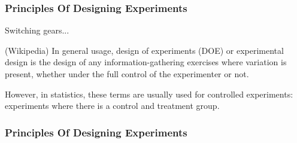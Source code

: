 \documentclass[handout]{beamer}
\newcommand{\blue}[1]{\textcolor{blue2}{#1}}
\begin{document}
\begin{frame}
\frametitle{Principles Of Designing Experiments}

Switching gears...

\vspace{0.5cm}

(Wikipedia) In general usage, \blue{design of experiments (DOE) or experimental design} is the design of any information-gathering exercises where variation is present, whether under the full control of the experimenter or not. 

\vspace{0.5cm}

\pause However, in statistics, these terms are usually used for \blue{controlled experiments}: experiments where there is a control and treatment group.

\end{frame}


\begin{frame}
\frametitle{Principles Of Designing Experiments}


\end{frame}
\end{document}
